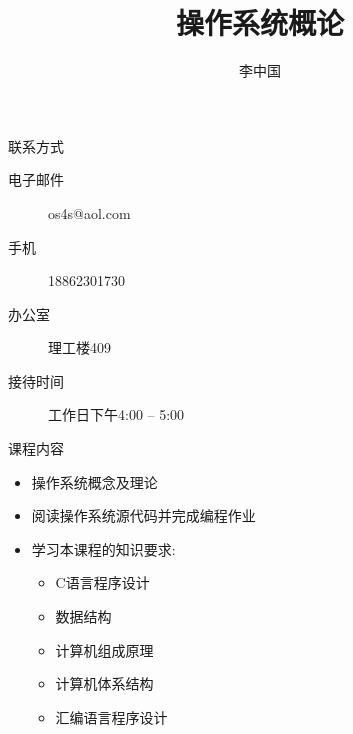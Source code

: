 \documentclass[xcolor=svgnames]{beamer}
\begin{document}
\begin{CJK*}{UTF8}{gbsn}



\title{操作系统概论}

\author{李中国}
\date{}

\begin{frame}
  \titlepage
\end{frame}


\begin{frame}{联系方式}
\begin{description}
\item[电子邮件] os4s@aol.com
\item[手机] 18862301730
\item[办公室] 理工楼409
\item[接待时间] 工作日下午4:00 -- 5:00
\end{description}
\end{frame}

\begin{frame}{课程内容}
\begin{itemize}
\item 操作系统概念及理论
\item 阅读操作系统源代码并完成编程作业
\item 学习本课程的知识要求:
\begin{itemize}
\item C语言程序设计
\item 数据结构
\item 计算机组成原理
\item 计算机体系结构
\item 汇编语言程序设计
\end{itemize}
\end{itemize}
\end{frame}


\end{CJK*}
\end{document}
